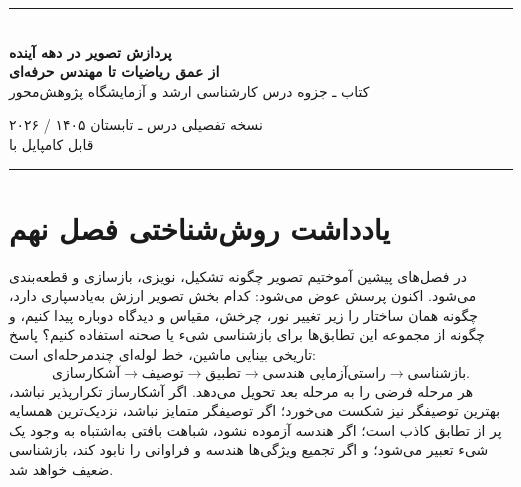 \documentclass[12pt,openany,oneside]{book}
\begin{document}
\begin{titlepage}
\centering
\vspace*{0.9cm}
{\color{DeepBlue}\rule{0.9\textwidth}{1.1pt}}\\[1.0cm]
{\Huge\bfseries پردازش تصویر در دهه آینده\\[0.3cm]}
{\LARGE\bfseries از عمق ریاضیات تا مهندس حرفه‌ای\\[0.85cm]}
{\Large کتاب ـ جزوه درس کارشناسی ارشد و آزمایشگاه پژوهش‌محور\\[1.1cm]}


\vfill
{\large نسخه تفصیلی درس ـ تابستان ۱۴۰۵ / ۲۰۲۶}\\[0.4cm]
{\normalsize قابل کامپایل با }\\[0.8cm]
{\color{DeepBlue}\rule{0.9\textwidth}{1.1pt}}
\end{titlepage}

\frontmatter

\chapter*{یادداشت روش‌شناختی فصل نهم}
در فصل‌های پیشین آموختیم تصویر چگونه تشکیل، نویزی، بازسازی و قطعه‌بندی می‌شود. اکنون پرسش عوض می‌شود:
کدام بخش تصویر ارزش به‌یادسپاری دارد، چگونه همان ساختار را زیر تغییر نور، چرخش، مقیاس و دیدگاه دوباره پیدا کنیم، و چگونه
از مجموعه این تطابق‌ها برای بازشناسی شیء یا صحنه استفاده کنیم؟ پاسخ تاریخی بینایی ماشین، خط لوله‌ای چندمرحله‌ای است:
\[
\text{آشکارسازی}\longrightarrow\text{توصیف}\longrightarrow\text{تطبیق}
\longrightarrow\text{راستی‌آزمایی هندسی}\longrightarrow\text{بازشناسی}.
\]
هر مرحله فرضی را به مرحله بعد تحویل می‌دهد. اگر آشکارساز تکرارپذیر نباشد، بهترین توصیفگر نیز شکست می‌خورد؛ اگر
توصیفگر متمایز نباشد، نزدیک‌ترین همسایه پر از تطابق کاذب است؛ اگر هندسه آزموده نشود، شباهت بافتی به‌اشتباه به
وجود یک شیء تعبیر می‌شود؛ و اگر تجمیع ویژگی‌ها هندسه و فراوانی را نابود کند، بازشناسی ضعیف خواهد شد.
\end{document}
